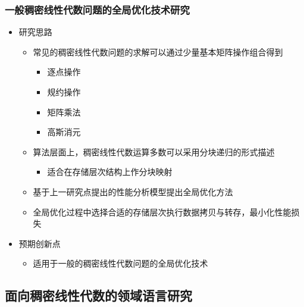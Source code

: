 \documentclass[aspectratio=169]{beamer}
\begin{document}
\begin{frame}
  \frametitle{一般稠密线性代数问题的全局优化技术研究}
  \begin{itemize}
  \item 研究思路
    \begin{itemize}
    \item 常见的稠密线性代数问题的求解可以通过少量基本矩阵操作组合得到
      \begin{itemize}
      \item 逐点操作
      \item 规约操作
      \item 矩阵乘法
      \item 高斯消元
      \end{itemize}
    \item 算法层面上，稠密线性代数运算多数可以采用分块递归的形式描述
      \begin{itemize}
      \item 适合在存储层次结构上作分块映射
      \end{itemize}
    \item 基于上一研究点提出的性能分析模型提出全局优化方法
    \item 全局优化过程中选择合适的存储层次执行数据拷贝与转存，最小化性能损失
    \end{itemize}
  \item 预期创新点
    \begin{itemize}
    \item 适用于一般的稠密线性代数问题的全局优化技术
    \end{itemize}
  \end{itemize}
\end{frame}

\subsection[领域语言研究]{面向稠密线性代数的领域语言研究}
\end{document}
